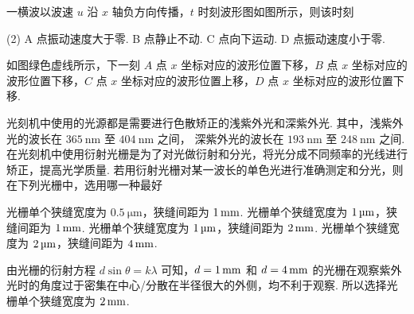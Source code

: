 \documentclass[quiet]{ctexart}
\begin{document}
\begin{textfig}[3:1]
  \begin{problem}
    一横波以波速 $u$ 沿 $x$ 轴负方向传播，$t$ 时刻波形图如图所示，则该时刻
    \begin{tasks}(2)
      \task A 点振动速度大于零.
      \task B 点静止不动.
      \task C 点向下运动.
      \task[\true] D 点振动速度小于零.
    \end{tasks}
  \end{problem}
  \textfigsplit \centering
\end{textfig}
\begin{solution}
  如图绿色虚线所示，下一刻 $A$ 点 $x$ 坐标对应的波形位置下移，$B$ 点 $x$ 坐标对应的波形位置下移，$C$ 点 $x$ 坐标对应的波形位置上移，$D$ 点 $x$ 坐标对应的波形位置下移.
\end{solution}

\begin{problem}
  光刻机中使用的光源都是需要进行色散矫正的浅紫外光和深紫外光.
  其中，浅紫外光的波长在 $\qty{365}\nm$ 至 $\qty{404}\nm$ 之间，
  深紫外光的波长在 $\qty{193}\nm$ 至 $\qty{248}\nm$ 之间.
  在光刻机中使用衍射光栅是为了对光做衍射和分光，将光分成不同频率的光线进行矫正，提高光学质量.
  若用衍射光栅对某一波长的单色光进行准确测定和分光，则在下列光栅中，选用哪一种最好
  \begin{tasks}
    \task 光栅单个狭缝宽度为 $\qty{0.5}\um$，狭缝间距为 $\qty1\mm$.
    \task 光栅单个狭缝宽度为 $\qty1\um$，狭缝间距为 $\qty1\mm$.
    \task[\true] 光栅单个狭缝宽度为 $\qty1\um$，狭缝间距为 $\qty2\mm$.
    \task 光栅单个狭缝宽度为 $\qty2\um$，狭缝间距为 $\qty4\mm$.
  \end{tasks}
\end{problem}
\begin{solution}
  由光栅的衍射方程 $d\sin\theta = k\lambda$ 可知，$d = \qty1\mm$ 和 $d = \qty4\mm$ 的光栅在观察紫外光时的角度过于密集在中心/分散在半径很大的外侧，均不利于观察. 所以选择光栅单个狭缝宽度为 $\qty2\mm$.
\end{solution}
\end{document}
